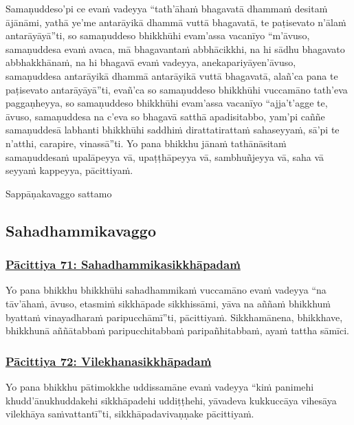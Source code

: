 Samaṇuddeso'pi ce evaṁ vadeyya “tath'āhaṁ bhagavatā dhammaṁ desitaṁ ājānāmi, yathā ye'me antarāyikā dhammā vuttā bhagavatā, te paṭisevato n'ālaṁ antarāyāyā”ti, so samaṇuddeso bhikkhūhi evam'assa vacanīyo “m'āvuso, samaṇuddesa evaṁ avaca, mā bhagavantaṁ abbhācikkhi, na hi sādhu bhagavato abbhakkhānaṁ, na hi bhagavā evaṁ vadeyya, anekapariyāyen'āvuso, samaṇuddesa antarāyikā dhammā antarāyikā vuttā bhagavatā, alañ'ca pana te paṭisevato antarāyāyā”ti, evañ'ca so samaṇuddeso bhikkhūhi vuccamāno tath'eva paggaṇheyya, so samaṇuddeso bhikkhūhi evam'assa vacanīyo “ajja't'agge te, āvuso, samaṇuddesa na c'eva so bhagavā satthā apadisitabbo, yam'pi caññe samaṇuddesā labhanti bhikkhūhi saddhiṁ dirattatirattaṁ sahaseyyaṁ, sā'pi te n'atthi, carapire, vinassā”ti. Yo pana bhikkhu jānaṁ tathānāsitaṁ samaṇuddesaṁ upalāpeyya vā, upaṭṭhāpeyya vā, sambhuñjeyya vā, saha vā seyyaṁ kappeyya, pācittiyaṁ.

\begin{center}
  Sappāṇakavaggo sattamo
\end{center}

\subsection{Sahadhammikavaggo}
\vspace{0.2cm}

\subsubsection*{\hyperref[exp71]{Pācittiya 71: Sahadhammikasikkhāpadaṁ}}
\label{pac71}

Yo pana bhikkhu bhikkhūhi sahadhammikaṁ vuccamāno evaṁ vadeyya “na tāv'āhaṁ, āvuso, etasmiṁ sikkhāpade sikkhissāmi, yāva na aññaṁ bhikkhuṁ byattaṁ vinayadharaṁ paripucchāmī”ti, pācittiyaṁ. Sikkhamānena, bhikkhave, bhikkhunā aññātabbaṁ paripucchitabbaṁ paripañhitabbaṁ, ayaṁ tattha sāmīci.

\subsubsection*{\hyperref[exp72]{Pācittiya 72: Vilekhanasikkhāpadaṁ}}
\label{pac72}

Yo pana bhikkhu pātimokkhe uddissamāne evaṁ vadeyya “kiṁ panimehi khudd'ānukhuddakehi sikkhāpadehi uddiṭṭhehi, yāvadeva kukkuccāya vihesāya vilekhāya saṁvattantī”ti, sikkhāpadavivaṇṇake pācittiyaṁ.

